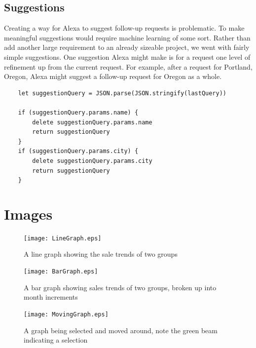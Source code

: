 \documentclass[onecolumn, draftclsnofoot,10pt, compsoc]{IEEEtran}
\begin{document}
    \subsection{Suggestions}
    Creating a way for Alexa to suggest follow-up requests is problematic. To make meaningful suggestions would require machine learning of some sort. Rather than add another large requirement to an already sizeable project, we went with fairly simple suggestions. One suggestion Alexa might make is for a request one level of refinement up from the current request. For example, after a request for Portland, Oregon, Alexa might suggest a follow-up request for Oregon as a whole.
    \begin{lstlisting}
    let suggestionQuery = JSON.parse(JSON.stringify(lastQuery))
    
    if (suggestionQuery.params.name) {
        delete suggestionQuery.params.name
        return suggestionQuery
    }
    if (suggestionQuery.params.city) {
        delete suggestionQuery.params.city
        return suggestionQuery
    }
    \end{lstlisting}

\section{Images}
\begin{figure}[h]
    \centering
  \texttt{[image: LineGraph.eps]}
  \caption{A line graph showing the sale trends of two groups}
\end{figure}
\begin{figure}[h]
    \centering
  \texttt{[image: BarGraph.eps]}
  \caption{A bar graph showing sales trends of two groups, broken up into month increments}
\end{figure}
\begin{figure}[h]
    \centering
  \texttt{[image: MovingGraph.eps]}
  \caption{A graph being selected and moved around, note the green beam indicating a selection}
\end{figure}
\end{document}
